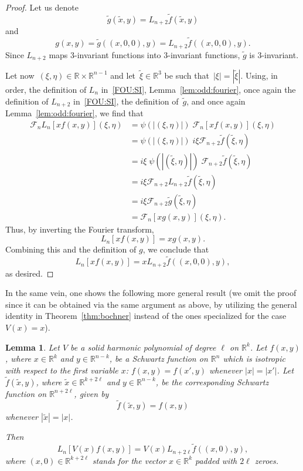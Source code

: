 \documentclass[a4paper,12pt,reqno]{amsart}
\numberwithin{equation}{section}
\newtheorem{lemma}[theorem]{Lemma}
\theoremstyle{definition}
\theoremstyle{notation}
\newcommand{\fourier}{\mathscr{F}}
\newcommand{\R}{\mathds{R}}
\begin{document}
\begin{proof}
Let us denote
\[
 \tilde{g}(\tilde{x}, y) = L_{n + 2} \tilde{f}(\tilde{x}, y)
\]
and
\[
 g(x, y) = \tilde{g}((x, 0, 0), y) = L_{n +2} \tilde{f}((x, 0, 0), y) .
\]
Since $L_{n + 2}$ maps $3$-invariant functions into $3$-invariant functions, $\tilde{g}$ is $3$-invariant.


Let now~$(\xi,\eta)\in\R\times\R^{n-1}$ and let~$\tilde\xi\in\R^3$ be such that~$|\xi| = |\tilde{\xi}|$. Using, in order, the definition of $L_n$
in~\eqref{FOU:SI}, Lemma~\ref{lem:odd:fourier}, once again the definition of $L_{n + 2}$ in~\eqref{FOU:SI}, the definition of~$\tilde{g}$, and once again Lemma~\ref{lem:odd:fourier}, we find that
\begin{align*}
 \fourier_n L_n[x f(x, y)](\xi, \eta) & = \psi(|(\xi, \eta)|)\;\fourier_n[x f(x, y)](\xi, \eta) \\
 & = \psi(|(\xi, \eta)|) \; i \xi \fourier_{n + 2} \tilde{f}(\tilde{\xi}, \eta) \\
 & = i \xi \; \psi(|(\tilde \xi, \eta)|) \; \fourier_{n + 2} \tilde{f}(\tilde{\xi}, \eta) \\
 & = i \xi \fourier_{n + 2} L_{n + 2} \tilde{f}(\tilde{\xi}, \eta) \\
 & = i \xi \fourier_{n + 2} \tilde{g}(\tilde{\xi}, \eta) \\
 & = \fourier_n[x g(x, y)](\xi, \eta) .
\end{align*}
Thus, by inverting the Fourier transform,
\[ L_n[x f(x, y)]=x g(x, y). \]
Combining this and the definition of $g$, we conclude that
\begin{equation*}
L_n[x f(x, y)]  %
=x L_{n + 2} \tilde{f}((x, 0, 0), y),
\end{equation*}
as desired.
\end{proof}


In the same vein, one shows the following more general result (we omit the proof since it can be obtained via the same argument as above, by utilizing the general identity in Theorem~\ref{thm:bochner} instead of the ones specialized for the case~$V(x)=x$).


\begin{lemma}
\label{lem:solid:operator}
Let $V$ be a solid harmonic polynomial of degree $\ell$ on $\R^k$. Let $f(x, y)$, where $x \in \R^k$ and $y \in \R^{n - k}$, be a Schwartz function on $\R^n$ which is isotropic with respect to the first variable $x$: $f(x, y) = f(x', y)$ whenever $|x| = |x'|$. Let $\tilde{f}(\tilde{x}, y)$, where $\tilde{x} \in \R^{k + 2 \ell}$ and $y \in \R^{n - k}$, be the corresponding Schwartz function on $\R^{n + 2 \ell}$, given by
\[
 \tilde{f}(\tilde{x}, y) = f(x, y)
\]
whenever $|\tilde{x}| = |x|$.


Then
\[
 L_n[V(x) f(x, y)] = V(x) L_{n + 2 \ell} \tilde{f}((x, 0), y) ,
\]
where $(x, 0) \in \R^{k + 2 \ell}$ stands for the vector $x \in \R^k$ padded with $2 \ell$ zeroes.
\end{lemma}
\end{document}

